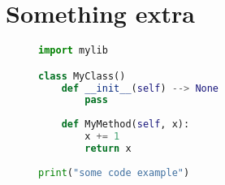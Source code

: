 \documentclass[main.tex]{subfiles}
\begin{document}
\begin{appendices}
\label{appendix}


\chapter{Something extra}
\label{app:extra}
\lipsum[1]

\begin{figure}[ht]
\centering
\begin{lstlisting}[language=python, label={lst:config-xml}, caption={Fancy code.}]
import mylib

class MyClass()
    def __init__(self) --> None
        pass
        
    def MyMethod(self, x):
        x += 1
        return x 
        
print("some code example")

    
\end{lstlisting}
\end{figure}

\lipsum[2]


\end{appendices}
\end{document}
